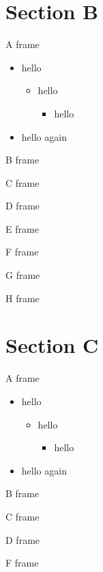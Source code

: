 \documentclass[aspectratio=43]{beamer}
\begin{document}
\section{Section B}
\begin{frame}{A frame}
\begin{itemize}
\item hello
\begin{itemize}
\item hello
\begin{itemize}
\item hello
\end{itemize}
\end{itemize}
\item hello again
\end{itemize}
\end{frame}
\begin{frame}{B frame}
\end{frame}
\begin{frame}{C frame}
\end{frame}
\begin{frame}{D frame}
\end{frame}
\begin{frame}{E frame}
\end{frame}
\begin{frame}{F frame}
\end{frame}
\begin{frame}{G frame}
\end{frame}
\begin{frame}{H frame}
\end{frame}

\section{Section C}
\begin{frame}{A frame}
\begin{itemize}
\item hello
\begin{itemize}
\item hello
\begin{itemize}
\item hello
\end{itemize}
\end{itemize}
\item hello again
\end{itemize}
\end{frame}
\begin{frame}{B frame}
\end{frame}
\begin{frame}{C frame}
\end{frame}
\begin{frame}{D frame}
\end{frame}
\begin{frame}{F frame}
\end{frame}
\end{document}
